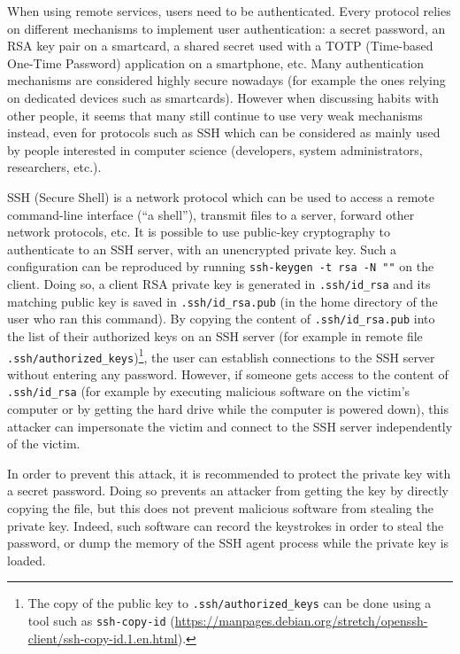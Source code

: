 When using remote services, users need to be authenticated. Every
protocol relies on different mechanisms to implement user
authentication: a secret password, an RSA key pair on a smartcard, a
shared secret used with a TOTP (Time-based One-Time Password)
application on a smartphone, etc. Many authentication mechanisms are
considered highly secure nowadays (for example the ones relying on
dedicated devices such as smartcards). However when discussing habits
with other people, it seems that many still continue to use very weak
mechanisms instead, even for protocols such as SSH which can be
considered as mainly used by people interested in computer science
(developers, system administrators, researchers, etc.).

SSH (Secure Shell) is a network protocol which can be used to access a
remote command-line interface (``a shell''), transmit files to a server,
forward other network protocols, etc. It is possible to use public-key
cryptography to authenticate to an SSH server, with an unencrypted
private key. Such a configuration can be reproduced by running
\texttt{ssh-keygen -t rsa -N ""} on the client. Doing
so, a client RSA private key is generated in
\texttt{.ssh/id\_rsa} and its matching public key is
saved in \texttt{.ssh/id\_rsa.pub} (in the home
directory of the user who ran this command). By copying the content of
\texttt{.ssh/id\_rsa.pub} into the list of their
authorized keys on an SSH server (for example in remote file
\texttt{.ssh/authorized\_keys})\footnote{The copy of
  the public key to \texttt{.ssh/authorized\_keys} can
  be done using a tool such as \texttt{ssh-copy-id}
  (\url{https://manpages.debian.org/stretch/openssh-client/ssh-copy-id.1.en.html}).},
the user can establish connections to the SSH server without entering
any password. However, if someone gets access to the content of
\texttt{.ssh/id\_rsa} (for example by executing
malicious software on the victim's computer or by getting the hard drive
while the computer is powered down), this attacker can impersonate the
victim and connect to the SSH server independently of the victim.

In order to prevent this attack, it is recommended to protect the
private key with a secret password. Doing so prevents an attacker from
getting the key by directly copying the file, but this does not prevent
malicious software from stealing the private key. Indeed, such software
can record the keystrokes in order to steal the password, or dump the
memory of the SSH agent process while the private key is loaded.

